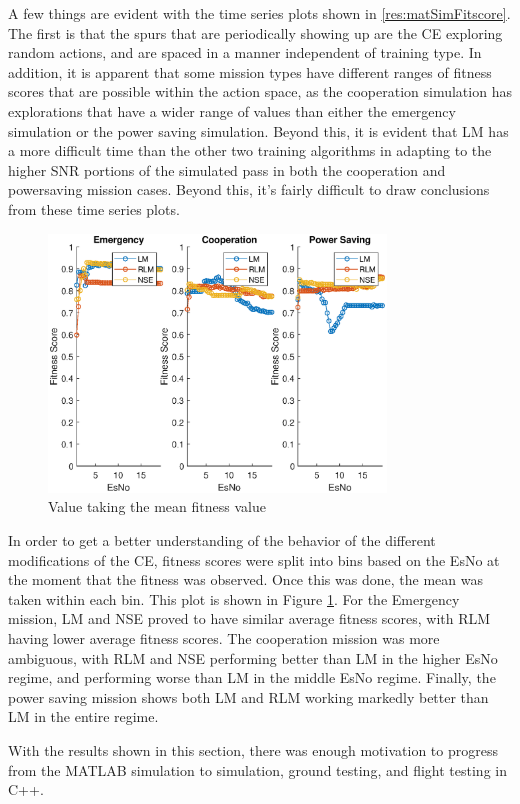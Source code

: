 \par A few things are evident with the time series plots shown in \ref{res:matSimFitscore}. The first is that the spurs that are periodically showing up are the CE exploring random actions, and are spaced in a manner independent of training type. In addition, it is apparent that some mission types have different ranges of fitness scores that are possible within the action space, as the cooperation simulation has explorations that have a wider range of values than either the emergency simulation or the power saving simulation. Beyond this, it is evident that LM has a more difficult time than the other two training algorithms in adapting to the higher SNR portions of the simulated pass in both the cooperation and powersaving mission cases. Beyond this, it's fairly difficult to draw conclusions from these time series plots.
\begin{figure}[!ht]
\centering
\includegraphics[width=0.8\textwidth]{figures/matlab_sim_results/binnedMeans_sim.eps}
\caption{Value taking the mean fitness value}
\label{res:matSimBinMean}
\end{figure}
\par In order to get a better understanding of the behavior of the different modifications of the CE, fitness scores were split into bins based on the EsNo at the moment that the fitness was observed. Once this was done, the mean was taken within each bin. This plot is shown in Figure \ref{res:matSimBinMean}. For the Emergency mission, LM and NSE proved to have similar average fitness scores, with RLM having lower average fitness scores. The cooperation mission was more ambiguous, with RLM and NSE performing better than LM in the higher EsNo regime, and performing worse than LM in the middle EsNo regime. Finally, the power saving mission shows both LM and RLM working markedly better than LM in the entire regime.
\par With the results shown in this section, there was enough motivation to progress from the MATLAB simulation to simulation, ground testing, and flight testing in C++. 
